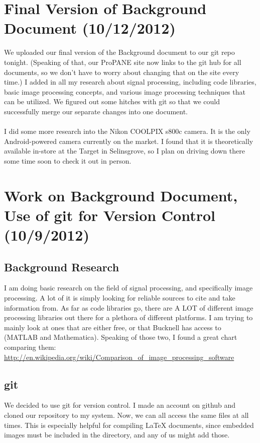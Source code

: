 \documentclass[]{article}
\begin{document}
	\section{Final Version of Background Document (10/12/2012)}
	We uploaded our final version of the Background document to our git repo tonight.  (Speaking of that, our ProPANE site now links to the git hub for all documents, so we don't have to worry about changing that on the site every time.)  I added in all my research about signal processing, including code libraries, basic image processing concepts, and various image processing techniques that can be utilized.  We figured out some hitches with git so that we could successfully merge our separate changes into one document.  \\ \\

I did some more research into the Nikon COOLPIX s800c camera.  It is the only Android-powered camera currently on the market.  I found that it is theoretically available in-store at the Target in Selinsgrove, so I plan on driving down there some time soon to check it out in person.  


	\section{Work on Background Document, Use of git for Version Control (10/9/2012)}
	\subsection*{Background Research}
	I am doing basic research on the field of signal processing, and specifically image processing.  A lot of it is simply looking for reliable sources to cite and take information from.  As far as code libraries go, there are A LOT of different image processing libraries out there for a plethora of different platforms.  I am trying to mainly look at ones that are either free, or that Bucknell has access to (MATLAB and Mathematica).  Speaking of those two, I found a great chart comparing them: \url{http://en.wikipedia.org/wiki/Comparison_of_image_processing_software} 

	\subsection*{git}
	We decided to use git for version control.  I made an account on github and cloned our repository to my system.  Now, we can all access the same files at all times. This is especially helpful for compiling LaTeX documents, since embedded images must be included in the directory, and any of us might add those.  
\end{document}

